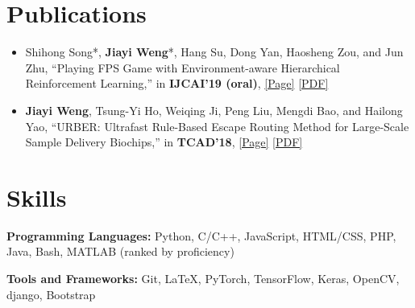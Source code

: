 \documentclass{resume}
\begin{document}
\section{Publications}
\begin{itemize}
    \item Shihong Song*, \textbf{Jiayi Weng}*, Hang Su, Dong Yan, Haosheng Zou, and Jun Zhu, ``Playing FPS Game with Environment-aware Hierarchical Reinforcement Learning,'' in \textbf{IJCAI'19 (oral)}, \href{https://trinkle23897.github.io/cv/viz2018.html}{[Page]} \href{https://www.ijcai.org/proceedings/2019/0482.pdf}{[PDF]}
    \item \textbf{Jiayi Weng}, Tsung-Yi Ho, Weiqing Ji, Peng Liu, Mengdi Bao, and Hailong Yao,  ``URBER: Ultrafast Rule-Based Escape Routing Method for Large-Scale Sample Delivery Biochips,'' in \textbf{TCAD'18}, \href{https://trinkle23897.github.io/cv/urber.html}{[Page]} \href{https://ieeexplore.ieee.org/document/8552446}{[PDF]}
\end{itemize}

\section{Skills}
\textbf{Programming Languages:} \small Python, C/C++, JavaScript, HTML/CSS, PHP, Java, Bash, MATLAB (ranked by proficiency)

\textbf{Tools and Frameworks:} \small Git, \LaTeX, PyTorch, TensorFlow, Keras, OpenCV, django, Bootstrap
\end{document}
